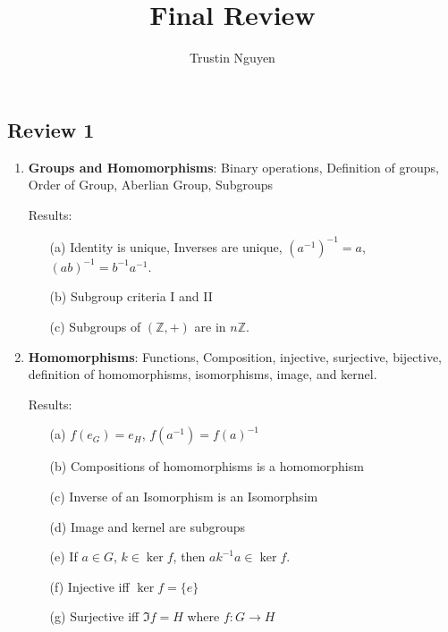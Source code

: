 \documentclass{article}
\title{Final Review}
\author{Trustin Nguyen}
\begin{document}
\maketitle
\reversemarginpar


\begin{topic}
	\section*{Review 1}
\end{topic}

\begin{enumerate}
	\item \textbf{Groups and Homomorphisms}: Binary operations, Definition of groups, Order of Group, Aberlian Group, Subgroups

	Results: 
	\begin{enumerate}
		\item [(a)] Identity is unique, Inverses are unique, $(a^{-1})^{-1} = a$, $(ab)^{-1} = b^{-1}a^{-1}$.
		
		\item [(b)] Subgroup criteria I and II

		\item [(c)] Subgroups of $(\mathbb{Z}, +)$ are in $n\mathbb{Z}$.
	\end{enumerate}

	\item \textbf{Homomorphisms}: Functions, Composition, injective, surjective, bijective, definition of homomorphisms, isomorphisms, image, and kernel.

	Results:
	\begin{enumerate}
		\item [(a)] $f(e_{G}) = e_{H}$, $f(a^{-1}) = f(a)^{-1}$

		\item [(b)] Compositions of homomorphisms is a homomorphism

		\item [(c)] Inverse of an Isomorphism is an Isomorphsim

		\item [(d)] Image and kernel are subgroups

		\item [(e)] If $a \in G$, $k \in \ker{f}$, then $ak^{-1}a \in \ker{f}$.

		\item [(f)] Injective iff $\ker{f} = \{e\}$

		\item [(g)] Surjective iff $\Im{f} = H$ where $f : G \rightarrow H$
	\end{enumerate}


\end{enumerate}
\end{document}

